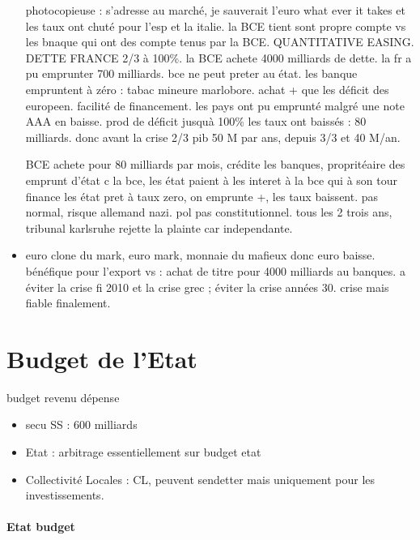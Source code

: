 \documentclass[a4paper,12pt]{article}
\begin{document}
\begin{itemize}
	photocopieuse : s'adresse au marché, je sauverait l'euro what ever it takes et les taux ont chuté pour l'esp et la 
	italie. la BCE tient sont propre compte vs les bnaque qui ont des compte tenus par la BCE.
	QUANTITATIVE EASING.  DETTE FRANCE 2/3 à 100\%.
	la BCE achete 4000 milliards de dette. la fr a pu emprunter 700 milliards. bce ne peut preter au état.
	les banque empruntent à zéro : tabac mineure marlobore. achat + que les déficit des europeen. facilité de financement. les pays ont pu emprunté malgré une note AAA en baisse. prod de déficit jusquà 100\%
	les taux ont baissés : 80 milliards. donc avant la crise 2/3 pib 50 M par ans, depuis 3/3 et 40 M/an.
	
	BCE achete pour 80 milliards par mois, crédite les banques, propritéaire des emprunt d'état c la bce,
	les état paient à les interet à la bce qui à son tour finance les état pret à taux zero, on emprunte +,
	les taux baissent. pas normal, risque allemand nazi. pol pas constitutionnel.
	tous les 2 trois ans, tribunal karlsruhe rejette la plainte car independante.
	
	\item euro clone du mark, euro mark, monnaie du mafieux donc euro baisse.
	bénéfique pour l'export vs     : achat de titre pour 4000 milliards au banques.
	a éviter la crise fi 2010 et la crise grec ; éviter la crise années 30. crise mais fiable finalement.
	
	
\end{itemize}



\section{Budget de l'Etat}

budget revenu dépense 


\begin{itemize}
	\item secu SS : 600 milliards
	\item Etat : arbitrage essentiellement sur budget etat
	\item Collectivité Locales : CL, peuvent sendetter mais uniquement pour les investissements. 
\end{itemize}

\paragraph{Etat budget}
\end{document}
